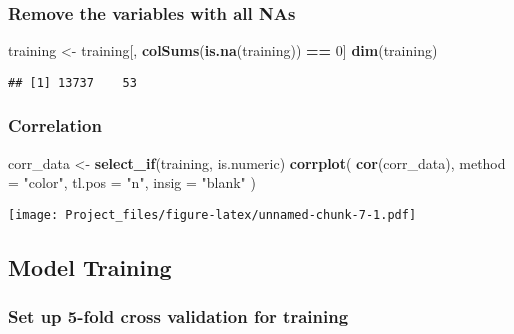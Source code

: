 \documentclass[
]{article}
\newenvironment{Shaded}{\begin{snugshade}}{\end{snugshade}}
\newcommand{\AttributeTok}[1]{\textcolor[rgb]{0.13,0.29,0.53}{#1}}
\newcommand{\DecValTok}[1]{\textcolor[rgb]{0.00,0.00,0.81}{#1}}
\newcommand{\FunctionTok}[1]{\textcolor[rgb]{0.13,0.29,0.53}{\textbf{#1}}}
\newcommand{\NormalTok}[1]{#1}
\newcommand{\OtherTok}[1]{\textcolor[rgb]{0.56,0.35,0.01}{#1}}
\newcommand{\SpecialCharTok}[1]{\textcolor[rgb]{0.81,0.36,0.00}{\textbf{#1}}}
\newcommand{\StringTok}[1]{\textcolor[rgb]{0.31,0.60,0.02}{#1}}
\begin{document}
\hypertarget{remove-the-variables-with-all-nas}{%
\subsubsection{Remove the variables with all
NAs}\label{remove-the-variables-with-all-nas}}

\begin{Shaded}
\begin{Highlighting}[]
\NormalTok{training }\OtherTok{\textless{}{-}}\NormalTok{ training[, }\FunctionTok{colSums}\NormalTok{(}\FunctionTok{is.na}\NormalTok{(training)) }\SpecialCharTok{==} \DecValTok{0}\NormalTok{]}
\FunctionTok{dim}\NormalTok{(training)}
\end{Highlighting}
\end{Shaded}

\begin{verbatim}
## [1] 13737    53
\end{verbatim}

\hypertarget{correlation}{%
\subsubsection{Correlation}\label{correlation}}

\begin{Shaded}
\begin{Highlighting}[]
\NormalTok{corr\_data }\OtherTok{\textless{}{-}} \FunctionTok{select\_if}\NormalTok{(training, is.numeric)}
\FunctionTok{corrplot}\NormalTok{(}
  \FunctionTok{cor}\NormalTok{(corr\_data),}
  \AttributeTok{method =} \StringTok{"color"}\NormalTok{,}
  \AttributeTok{tl.pos =} \StringTok{"n"}\NormalTok{,}
  \AttributeTok{insig =} \StringTok{"blank"}
\NormalTok{)}
\end{Highlighting}
\end{Shaded}

\texttt{[image: Project\_files/figure-latex/unnamed-chunk-7-1.pdf]}

\hypertarget{model-training}{%
\subsection{Model Training}\label{model-training}}

\hypertarget{set-up-5-fold-cross-validation-for-training}{%
\subsubsection{Set up 5-fold cross validation for
training}\label{set-up-5-fold-cross-validation-for-training}}
\end{document}
